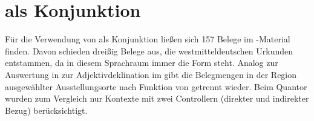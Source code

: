 
\section{ als Konjunktion}
\label{sec:caokonjunktion}

Für die Verwendung von  als Konjunktion ließen sich 157 Belege im
\CAO{}-Material finden. Davon schieden dreißig Belege aus, die
westmitteldeutschen Urkunden entstammen, da in diesem
Sprachraum immer die Form  steht. Analog zur Auswertung in
 zur Adjektivdeklination im \CAO{} gibt
 die Belegmengen in der Region ausgewählter
Ausstellungs\-orte nach Funktion von  getrennt wieder. Beim Quantor
wurden zum Vergleich nur Kontexte mit zwei Controllern (direkter und indirekter
Bezug) berücksichtigt.

